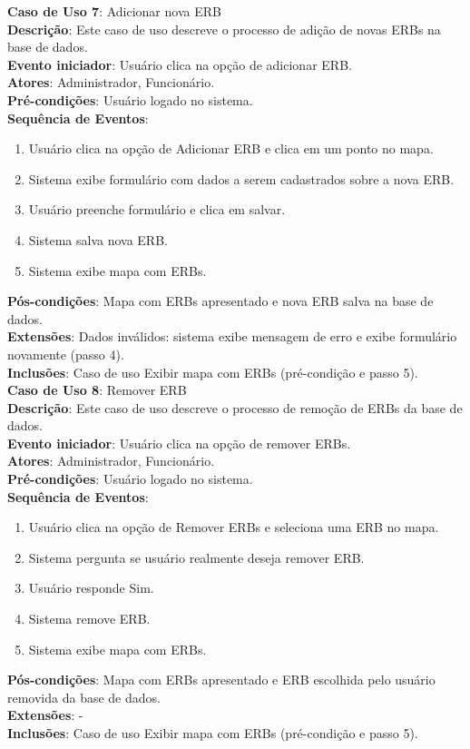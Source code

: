 \documentclass[]{politex}
\begin{document}
\noindent \textbf{Caso de Uso 7}: Adicionar nova ERB \\
\textbf{Descrição}: Este caso de uso descreve o processo de adição de novas
ERBs na base de dados. \\
\textbf{Evento iniciador}: Usuário clica na opção de adicionar ERB. \\
\textbf{Atores}: Administrador, Funcionário. \\
\textbf{Pré-condições}: Usuário logado no sistema. \\
\textbf{Sequência de Eventos}:
\begin{enumerate}
\item Usuário clica na opção de Adicionar ERB e clica em um ponto no mapa.
\item Sistema exibe formulário com dados a serem cadastrados sobre a nova ERB.
\item Usuário preenche formulário e clica em salvar.
\item Sistema salva nova ERB.
\item Sistema exibe mapa com ERBs.
\end{enumerate}
\textbf{Pós-condições}: Mapa com ERBs apresentado e nova ERB salva na base de
dados. \\
\textbf{Extensões}: Dados inválidos: sistema exibe mensagem de erro e exibe 
formulário novamente (passo 4). \\
\textbf{Inclusões}: Caso de uso Exibir mapa com ERBs (pré-condição e passo 5).\\

\noindent \textbf{Caso de Uso 8}: Remover ERB \\
\textbf{Descrição}: Este caso de uso descreve o processo de remoção de ERBs da
base de dados. \\
\textbf{Evento iniciador}: Usuário clica na opção de remover ERBs. \\
\textbf{Atores}: Administrador, Funcionário. \\
\textbf{Pré-condições}: Usuário logado no sistema. \\
\textbf{Sequência de Eventos}:
\begin{enumerate}
\item Usuário clica na opção de Remover ERBs e seleciona uma ERB no mapa.
\item Sistema pergunta se usuário realmente deseja remover ERB.
\item Usuário responde Sim.
\item Sistema remove ERB.
\item Sistema exibe mapa com ERBs.
\end{enumerate}
\textbf{Pós-condições}: Mapa com ERBs apresentado e ERB escolhida pelo usuário
removida da base de dados. \\
\textbf{Extensões}: - \\
\textbf{Inclusões}: Caso de uso Exibir mapa com ERBs (pré-condição e passo 5). \\
\end{document}
